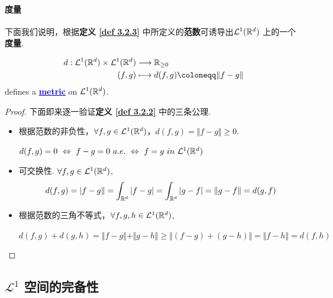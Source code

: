 \vspace{2em}
\paragraph{度量}
	下面我们说明，根据\textbf{定义 \ref{def 3.2.3}} 中所定义的\textbf{范数}可诱导出$\mathcal{L}^{1}(\mathbb{R}^d)$ 上的一个\textbf{度量}.
	
	\begin{proposition}\label{prop 3.2.1}
		\begin{align}
			d : \mathcal{L}^{1}(\R^d) \times \mathcal{L}^{1}(\R^d) &\longrightarrow \R_{\geq 0} \\
			(f , g) &\longmapsto d(f , g) \coloneqq \Vert f - g \Vert
		\end{align}
		defines a \underline{\textcolor{blue}{\textbf{metric}}} on $\mathcal{L}^{1}(\mathbb{R}^d)$.
		
		\vspace{2em}
		\begin{proof}
			下面即来逐一验证\textbf{定义 \ref{def 3.2.2}} 中的三条公理.
			\begin{itemize}
				\item 根据范数的非负性，$\forall f , g \in \mathcal{L}^{1}(\mathbb{R}^d)$，$d(f , g) = \Vert f - g \Vert \geq 0$.
				\begin{center}
					$d(f , g) = 0 \,\, \Leftrightarrow \,\, f - g = 0 \,\, a.e. \,\, \Leftrightarrow \,\, f = g \,\, in \,\, \mathcal{L}^{1}(\mathbb{R}^d)$
				\end{center}
			
				\item 可交换性. $\forall f , g \in \mathcal{L}^{1}(\mathbb{R}^d)$,
				\begin{align}
					d(f , g) = \vert f - g \Vert = \int_{\mathbb{R}^d}{\left| f - g \right|} = \int_{\mathbb{R}^d}{\left| g - f \right|} = \Vert g - f \Vert = d(g , f)
				\end{align}
			
				\item 根据范数的三角不等式，$\forall f, g , h \in \mathcal{L}^{1}(\mathbb{R}^d)$,
				\begin{center}
					$d(f , g) + d(g , h) = \Vert f - g \Vert + \Vert g - h \Vert \geq \Vert (f - g) + (g - h) \Vert = \Vert f - h \Vert = d(f , h)$
				\end{center}
			\end{itemize}
		\end{proof}
	\end{proposition}

\newpage
\subsection{$\mathcal{L}^1$ 空间的完备性}
